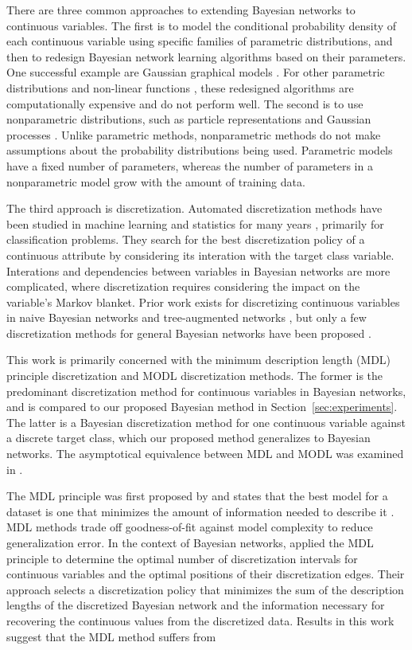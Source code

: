 There are three common approaches to extending Bayesian networks to continuous variables.
The first is to model the conditional probability density of each continuous variable using specific families of parametric distributions, and then to redesign Bayesian network learning algorithms based on their parameters.
One successful example are Gaussian graphical models \citep{Weiss_2011}.
For other parametric distributions and non-linear functions \citep{Ihler_2009}, these redesigned algorithms are computationally expensive and do not perform well.
The second is to use nonparametric distributions, such as particle representations and Gaussian processes \citep{Ickstadt_2010}.
Unlike parametric methods, nonparametric methods do not make assumptions about the probability distributions being used.
Parametric models have a fixed number of parameters, whereas the number of parameters in a nonparametric model grow with the amount of training data.

The third approach is discretization.
Automated discretization methods have been studied in machine learning and statistics for many years \citep{Dougherty_1995, Kerber_1992, Holte_1993, Fayyad_1993}, primarily for classification problems.
They search for the best discretization policy of a continuous attribute by considering its interation with the target class variable.
Interations and dependencies between variables in Bayesian networks are more complicated, where discretization requires considering the impact on the variable's Markov blanket.
Prior work exists for discretizing continuous variables in naive Bayesian networks and tree-augmented networks \citep{Fried_naive}, but only a few discretization methods for general Bayesian networks have been proposed \citep{Friedman_1996, Kozlov_1997, Monti_1998, Steck_2007}.


This work is primarily concerned with the minimum description length (MDL) principle discretization \citep{Friedman_1996} and MODL discretization \citep{Boulle_2006} methods.
The former is the predominant discretization method for continuous variables in Bayesian networks, and is compared to our proposed Bayesian method in Section~\ref{sec:experiments}.
The latter is a Bayesian discretization method for one continuous variable against a discrete target class, which our proposed method generalizes to Bayesian networks.
The asymptotical equivalence between MDL and MODL was examined in \citep{VL_2000}.

The MDL principle was first proposed by \cite{MDL_1978} and states that the best model for a dataset is one that minimizes the amount of information needed to describe it \citep{Grunwald_2009}.
MDL methods trade off goodness-of-fit against model complexity to reduce generalization error.
In the context of Bayesian networks, \cite{Friedman_1996} applied the MDL principle to determine the optimal number of discretization intervals for continuous variables and the optimal positions of their discretization edges.
Their approach selects a discretization policy that minimizes the sum of the description lengths of the discretized Bayesian network and the information necessary for recovering the continuous values from the discretized data.
Results in this work suggest that the MDL method suffers from 

